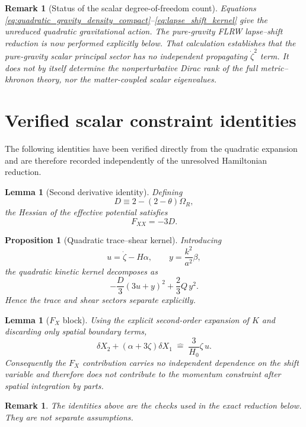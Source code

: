 \documentclass[11pt,a4paper]{article}
\newtheorem{lemma}[axiom]{Lemma}
\newtheorem{proposition}[axiom]{Proposition}
\newtheorem{remark}[axiom]{Remark}
\begin{document}
\begin{remark}[Status of the scalar degree-of-freedom count]
Equations \eqref{eq:quadratic_gravity_density_compact}--\eqref{eq:lapse_shift_kernel}
give the unreduced quadratic gravitational action. The pure-gravity FLRW lapse--shift
reduction is now performed explicitly below. That calculation establishes that the
pure-gravity scalar principal sector has no independent propagating \(\dot\zeta^2\)
term. It does not by itself determine the nonperturbative Dirac rank of the full
metric--khronon theory, nor the matter-coupled scalar eigenvalues.
\end{remark}



\section{Verified scalar constraint identities}

The following identities have been verified directly from the quadratic expansion and are therefore recorded independently of the unresolved Hamiltonian reduction.

\begin{lemma}[Second derivative identity]
Defining
\[
D\equiv 2-(2-\theta)\Omega_R,
\]
the Hessian of the effective potential satisfies
\[
F_{XX}=-3D.
\]
\end{lemma}

\begin{proposition}[Quadratic trace--shear kernel]
Introducing
\[
u=\dot\zeta-H\alpha,
\qquad
y=\frac{k^2}{a^2}\beta,
\]
the quadratic kinetic kernel decomposes as
\[
-\frac{D}{3}(3u+y)^2+\frac23Q\,y^2.
\]
Hence the trace and shear sectors separate explicitly.
\end{proposition}

\begin{lemma}[$F_X$ block]
Using the explicit second-order expansion of $K$ and discarding only spatial boundary terms,
\[
\delta X_2+(\alpha+3\zeta)\delta X_1
\;\widehat{=}\;
\frac{3}{H_0}\zeta\,u.
\]
Consequently the $F_X$ contribution carries no independent dependence on the shift variable and therefore does not contribute to the momentum constraint after spatial integration by parts.
\end{lemma}

\begin{remark}
The identities above are the checks used in the exact reduction below. They are not
separate assumptions.
\end{remark}
\end{document}
